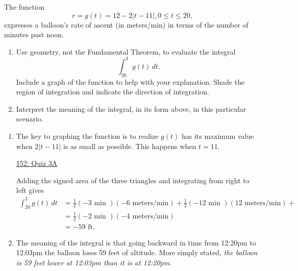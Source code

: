 \documentclass{ximera}
\begin{document}
\begin{question} \label{QLferr3r}
The function
\[
 r =g(t) = 12 -2 |t - 11| , 0 \leq t \leq 20,
\]
expresses a balloon’s rate of ascent (in meters/min) in terms of the number of minutes past noon.

\begin{enumerate}
\item Use geometry, not the Fundamental Theorem, to evaluate the integral
\[
  \int_{20}^3 g(t) \, dt.
\]
Include a graph of the function to help with your explanation. Shade the region of integration and indicate the direction of integration.

\item Interpret the meaning of the integral, in its form above, in this particular scenario.
\end{enumerate}

\begin{explanation}

\begin{enumerate}

\item The key to graphing the function is to realize $g(t)$ has its maximum value when $2|t-11|$ is as small as possible. This happens when $t=11$. 

\begin{onlineOnly}
    \begin{center}
\end{center}
\end{onlineOnly}

\href{https://www.desmos.com/calculator/wioqqjwyt9}{152: Quiz 3A}

Adding the signed area of the three triangles and integrating from right to left gives
\begin{align*}
\int_{20}^3 g(t) \, dt   &= \frac{1}{2}(-3 \text{ min })(-6 \text{ meters/min}) + \frac{1}{2}(-12 \text{ min })(12 \text{ meters/min})  +  \\
                            &= \frac{1}{2}(-2 \text{ min })(-4 \text{ meters/min})    \\
                                &= - 59 \text{ ft}.
\end{align*}

\item The meaning of the integral is that going backward in time from 12:20pm to 12:03pm the balloon loses 59 feet of altitude. More simply stated, \emph{the balloon is 59 feet lower at 12:03pm than it is at 12:20pm.}

\end{enumerate}

\end{explanation}

\end{question}
\end{document}
